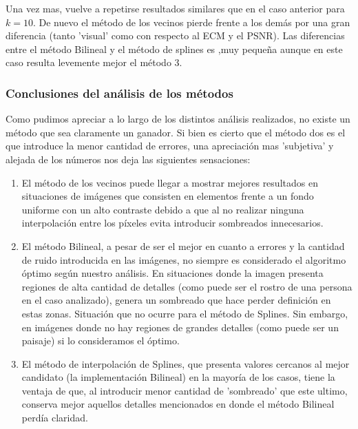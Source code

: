 Una vez mas, vuelve a repetirse resultados similares que en el caso anterior para $k=10$. De nuevo el método de los vecinos pierde frente a los demás por una gran diferencia (tanto 'visual' como con respecto al ECM y el PSNR). Las diferencias entre el método Bilineal y el método de splines es ,muy pequeña aunque en este caso resulta levemente mejor el método 3.


\subsubsection{Conclusiones del análisis de los métodos}
Como pudimos apreciar a lo largo de los distintos análisis realizados, no existe un método que sea claramente un ganador.
Si bien es cierto que el método dos es el que introduce la menor cantidad de errores, una apreciación mas 'subjetiva' y alejada de los números nos deja las siguientes sensaciones:
\begin{enumerate}
 \item El método de los vecinos puede llegar a mostrar mejores resultados en situaciones de imágenes que consisten en elementos frente a un fondo uniforme con un alto contraste debido a que al no realizar ninguna interpolación entre los píxeles evita introducir sombreados innecesarios.
 \item El método Bilineal, a pesar de ser el mejor en cuanto a errores y la cantidad de ruido introducida en las imágenes, no siempre es considerado el algoritmo óptimo según nuestro análisis. En situaciones donde la imagen presenta regiones de alta cantidad de detalles (como puede ser el rostro de una persona en el caso analizado), genera un sombreado que hace perder definición en estas zonas. Situación que no ocurre para el método de Splines. Sin embargo, en imágenes donde no hay regiones de grandes detalles (como puede ser un paisaje) si lo consideramos el óptimo.
 \item El método de interpolación de Splines, que presenta valores cercanos al mejor candidato (la implementación Bilineal) en la mayoría de los casos, tiene la ventaja de que, al introducir menor cantidad de 'sombreado' que este ultimo, conserva mejor aquellos detalles mencionados en donde el método Bilineal perdía claridad.
\end{enumerate}



